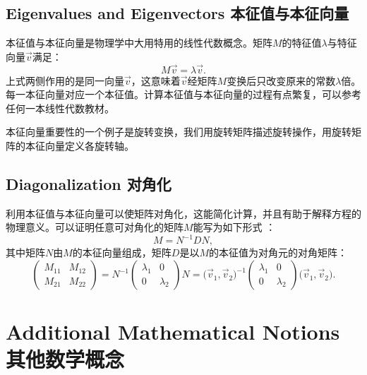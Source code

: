 \section[本征值与本征向量]{Eigenvalues and Eigenvectors 本征值与本征向量}
\label{sec.C.4}
本征值与本征向量是物理学中大用特用的线性代数概念。矩阵$M$的特征值$\lambda$与特征向量$\vec{v}$满足：
\begin{equation}
\label{equC.8}
	M \vec{v} = \lambda \vec{v}.
\end{equation}
上式两侧作用的是同一向量$\vec{v}$，这意味着$\vec{v}$经矩阵$M$变换后只改变原来的常数$\lambda$倍。每一本征向量对应一个本征值。计算本征值与本征向量的过程有点繁复，可以参考任何一本线性代数教材。

本征向量重要性的一个例子是旋转变换，我们用旋转矩阵描述旋转操作，用旋转矩阵的本征向量定义各旋转轴。


\section[对角化]{Diagonalization 对角化}
\label{sec.C.5}
利用本征值与本征向量可以使矩阵对角化，这能简化计算，并且有助于解释方程的物理意义。可以证明任意可对角化的矩阵$M$能写为如下形式%
%
：
\begin{equation}
\label{equC.9}
	M = N^{-1} D N,
\end{equation}
其中矩阵$N$由$M$的本征向量组成，矩阵$D$是以$M$的本征值为对角元的对角矩阵：
\begin{equation}
\label{equC.10}
	\begin{pmatrix}
		M_{11} & M_{12} \\
		M_{21} & M_{22}
	\end{pmatrix}
	= N^{-1}
		\begin{pmatrix}
			\lambda_1 & 0 \\
			0 & \lambda_2
		\end{pmatrix}
	N = \Big( \vec{v}_1, \vec{v}_2 \Big)^{-1}
		\begin{pmatrix}
			\lambda_1 & 0 \\
			0 & \lambda_2
		\end{pmatrix}
	\Big( \vec{v}_1, \vec{v}_2 \Big).
\end{equation}


\chapter[其他数学概念]{Additional Mathematical
Notions \quad 其他数学概念}
